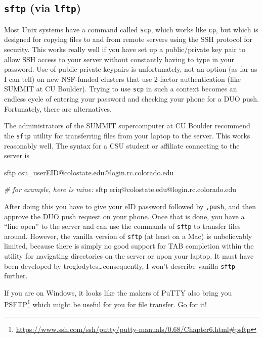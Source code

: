 \documentclass[]{krantz}
\makeatletter
\newenvironment{Shaded}{\begin{snugshade}}{\end{snugshade}}
\newcommand{\CommentTok}[1]{\textcolor[rgb]{0.37,0.37,0.37}{\textit{#1}}}
\newcommand{\ExtensionTok}[1]{#1}
\newcommand{\NormalTok}[1]{#1}
\renewcommand{\href}[2]{#2\footnote{\url{#1}}}
\newenvironment{kframe}{%
\medskip{}
\setlength{\fboxsep}{.8em}
 \def\at@end@of@kframe{}%
 \ifinner\ifhmode%
  \def\at@end@of@kframe{\end{minipage}}%
  \begin{minipage}{\columnwidth}%
 \fi\fi%
 \def\FrameCommand##1{\hskip\@totalleftmargin \hskip-\fboxsep
 \colorbox{shadecolor}{##1}\hskip-\fboxsep
     \hskip-\linewidth \hskip-\@totalleftmargin \hskip\columnwidth}%
 \MakeFramed {\advance\hsize-\width
   \@totalleftmargin\z@ \linewidth\hsize
   \@setminipage}}%
 {\par\unskip\endMakeFramed%
 \at@end@of@kframe}
\renewenvironment{Shaded}{\begin{kframe}}{\end{kframe}}
\makeatother
\begin{document}
\hypertarget{sftp-via-lftp}{%
\subsection{\texorpdfstring{\texttt{sftp} (via \texttt{lftp})}{sftp (via lftp)}}\label{sftp-via-lftp}}

Most Unix systems have a command called \texttt{scp}, which works like \texttt{cp}, but which is
designed for copying files to and from
remote servers using the SSH protocol for security. This works really well
if you have set up a public/private key pair to allow SSH access to your server
without constantly having to type in your password. Use of public-private keypairs is unfortunately, not
an option (as far as I can tell) on new NSF-funded clusters that use 2-factor authentication (like SUMMIT
at CU Boulder). Trying to use \texttt{scp} in such a context becomes an endless cycle of
entering your password and checking your phone for a DUO push. Fortunately, there are
alternatives.

The administrators of the SUMMIT supercomputer at CU Boulder recommend
the \texttt{sftp} utility for transferring files from your laptop to the server.
This works reasonably well. The syntax for a CSU student or affiliate connecting to the server is

\begin{Shaded}
\begin{Highlighting}[]
\ExtensionTok{sftp}\NormalTok{ csu_userEID@colostate.edu@login.rc.colorado.edu}

\CommentTok{# for example, here is mine:}
\ExtensionTok{sftp}\NormalTok{ eriq@colostate.edu@login.rc.colorado.edu}
\end{Highlighting}
\end{Shaded}

After doing this you have to give your eID password followed by \texttt{,push}, and then
approve the DUO push request on your phone. Once that is done, you have a ``line open''
to the server and can use the commands of \texttt{sftp} to transfer files around.
However, the vanilla version of \texttt{sftp} (at least on a Mac) is unbelievably limited,
because there is simply no good support for TAB completion within
the utility for navigating directories on the server or upon your laptop.
It must have been developed by troglodytes\ldots{}consequently, I won't describe
vanilla \texttt{sftp} further.

If you are on Windows, it looks like the makers of PuTTY also bring you
\href{https://www.ssh.com/ssh/putty/putty-manuals/0.68/Chapter6.html\#psftp}{PSFTP} which
might be useful for you for file transfer. Go for it!
\end{document}

